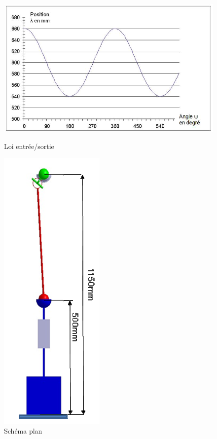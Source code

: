 \begin{figure}[htbp]
\begin{minipage}[c]{.6\linewidth}
\begin{center}
\includegraphics[width=\linewidth]{img/Poinc3.png}
\caption{Loi entrée/sortie}
\label{fig:image17}
\end{center}
\end{minipage}
\hfill
\begin{minipage}[c]{.45\linewidth}
\begin{center}
\includegraphics[width=0.3\linewidth]{img/Poinc4.png}
\caption{Schéma plan}
\label{fig:image18}
\end{center}
\end{minipage}
\end{figure}


